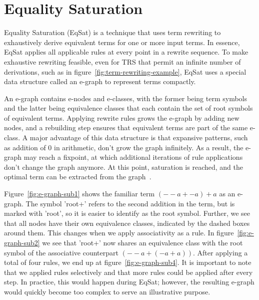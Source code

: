 \section{Equality Saturation}
\label{sec:equality-saturation}

Equality Saturation (EqSat) is a technique that uses term rewriting to exhaustively derive equivalent terms for one or more input terms. In essence, EqSat applies all applicable rules at every point in a rewrite sequence. To make exhaustive rewriting feasible, even for TRS that permit an infinite number of derivations, such as in figure~\ref{fig:term-rewriting-example}, EqSat uses a special data structure called an e-graph to represent terms compactly.

An e-graph contains e-nodes and e-classes, with the former being term symbols and the latter being equivalence classes that each contain the set of root symbols of equivalent terms. Applying rewrite rules grows the e-graph by adding new nodes, and a rebuilding step ensures that equivalent terms are part of the same e-class. A major advantage of this data structure is that expansive patterns, such as addition of 0 in arithmetic, don’t grow the graph infinitely. As a result, the e-graph may reach a fixpoint, at which additional iterations of rule applications don’t change the graph anymore. At this point, saturation is reached, and the optimal term can be extracted from the graph~\citep{Willsey_2021}.

Figure~\ref{fig:e-graph-sub1} shows the familiar term $(--a + -a) + a$ as an e-graph. The symbol 'root+' refers to the second addition in the term, but is marked with 'root', so it is easier to identify as the root symbol. Further, we see that all nodes have their own equivalence classes, indicated by the dashed boxes around them. This changes when we apply associativity as a rule. In figure~\ref{fig:e-graph-sub2} we see that 'root+' now shares an equivalence class with the root symbol of the associative counterpart $(--a + (-a + a))$. After applying a total of four rules, we end up at figure~\ref{fig:e-graph-sub4}. It is important to note that we applied rules selectively and that more rules could be applied after every step. In practice, this would happen during EqSat; however, the resulting e-graph would quickly become too complex to serve an illustrative purpose.

